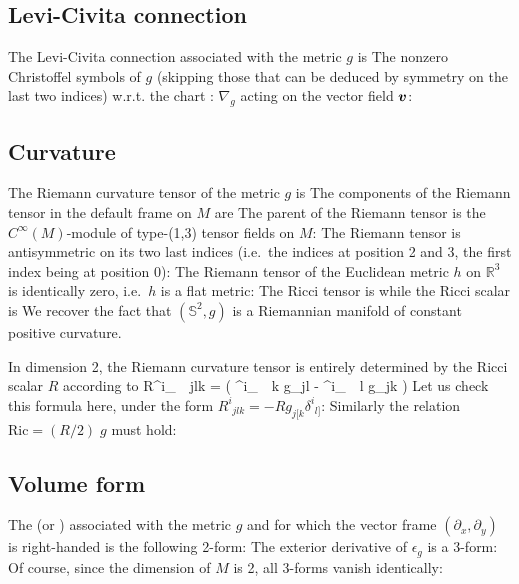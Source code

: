 \subsection{Levi-Civita connection}

The Levi-Civita connection associated with the metric $g$ is
The nonzero Christoffel symbols of $g$ (skipping those that can be deduced by symmetry on the last two indices) w.r.t. the chart :
$\nabla_g$ acting on the vector field $\bm{v}$:

\subsection{Curvature}

The Riemann curvature tensor of the metric $g$ is
The components of the Riemann tensor in the default frame on $M$ are
The parent of the Riemann tensor is the $C^\infty(M)$-module of
type-(1,3) tensor fields on $M$:
The Riemann tensor is antisymmetric on its two last indices (i.e.\ the indices
at position 2 and 3, the first index being at position 0):
The Riemann tensor of the Euclidean metric $h$ on $\mathbb{R}^3$ is identically zero,
i.e.\ $h$ is a flat metric:
The Ricci tensor is
while the Ricci scalar is
We recover the fact that $(\mathbb{S}^2,g)$ is a Riemannian manifold of constant positive curvature.

In dimension 2, the Riemann curvature tensor is entirely determined by the Ricci scalar $R$ according to
\be
 R^i_{\ \, jlk} =  \left( \delta^i_{\ \, k} g_{jl} - \delta^i_{\ \, l} g_{jk} \right)
\ee
Let us check this formula here, under the form
$R^i_{\ \, jlk} = -R g_{j[k} \delta^i_{\ \, l]}$:
Similarly the relation $\mathrm{Ric} = (R/2)\; g$ must hold:

\subsection{Volume form}

The  (or ) associated with the
metric $g$ and for which the vector frame $(\partial_x,\partial_y)$ is
right-handed is the following 2-form:
The exterior derivative of $\epsilon_g$ is a 3-form:
Of course, since the dimension of $M$ is 2, all 3-forms vanish identically:











